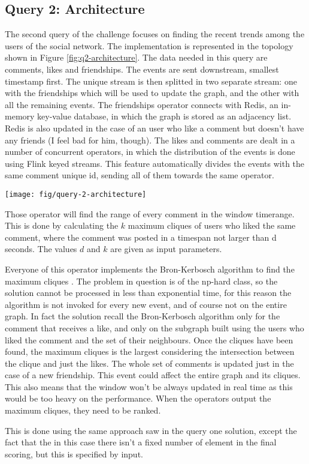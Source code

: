 \subsection{Query 2: Architecture}
\label{sec:solution-q2}

The second query of the challenge focuses on finding the recent trends among the users of the social network. The implementation is represented in the topology shown in Figure \ref{fig:q2-architecture}. The data needed in this query are comments, likes and friendships. The events are sent downstream, smallest timestamp first. The unique stream is then splitted in two separate stream: one with the friendships which will be used to update the graph, and the other with all the remaining events. The friendships operator connects with Redis, an in-memory key-value database, in which the graph is stored as an adjacency list. Redis is also updated in the case of an user who like a comment but doesn't have any friends (I feel bad for him, though). The likes and comments are dealt in a number of concurrent operators, in which the distribution of the events is done using Flink keyed streams. This feature automatically divides the events with the same comment unique id, sending all of them towards the same operator.

\begin{figure*}[]
	\centering
	\texttt{[image: fig/query-2-architecture]}
	\caption{The topology of operators for Query 2.}
	\label{fig:q2-architecture}
\end{figure*}

Those operator will find the range of every comment in the window timerange. This is done by calculating the $k$ maximum cliques of users who liked the same comment, where the comment was posted in a timespan not larger than d seconds. The values $d$ and $k$ are given as input parameters.

Everyone of this operator implements the Bron-Kerbosch algorithm to find the maximum cliques \cite{BronKerbosch1973}. The problem in question is of the np-hard class, so the solution cannot be processed in less than exponential time, for this reason the algorithm is not invoked for every new event, and of course not on the entire graph. In fact the solution recall the Bron-Kerbosch algorithm only for the comment that receives a like, and only on the subgraph built using the users who liked the comment and the set of their neighbours. Once the cliques have been found, the maximum cliques is the largest considering the intersection between the clique and just the likes. The whole set of comments is updated just in the case of a new friendship. This event could affect the entire graph and its cliques. This also means that the window won't be always updated in real time as this would be too heavy on the performance. When the operators output the maximum cliques, they need to be ranked. 

This is done using the same approach saw in the query one solution, except the fact that the in this case there isn't a fixed number of element in the final scoring, but this is specified by input.
